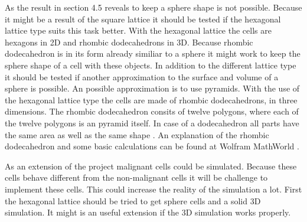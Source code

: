 As the result in section 4.5 reveals to keep a sphere shape is not possible. Because it might be a result of the square lattice it should be tested if the hexagonal lattice type suits this task better. With the hexagonal lattice the cells are hexagons in 2D and rhombic dodecahedrons in 3D. Because rhombic dodecahedron is in its form already similiar to a sphere it might work to keep the sphere shape of a cell with these objects. \newline
In addition to the different lattice type it should be tested if another approximation to the surface and volume of a sphere is possible. An possible approximation is to use pyramids. With the use of the hexagonal lattice type the cells are made of rhombic dodecahedrons, in three dimensions. The rhombic dodecahedron consits of twelve polygons, where each of the twelve polygons is an pyramid itself. In case of a dodecahedron all parts have the same area as well as the same shape \cite{Horn1984}. An explanation of the rhombic dodecahedron and some basic calculations can be found at Wolfram MathWorld \cite{RhombicDodecahedron.html}.

As an extension of the project malignant cells could be simulated. Because these cells behave different from the non-malignant cells it will be challenge to implement these cells. This could increase the reality of the simulation a lot. First the hexagonal lattice should be tried to get sphere cells and a solid 3D simulation. It might is an useful extension if the 3D simulation works properly.

